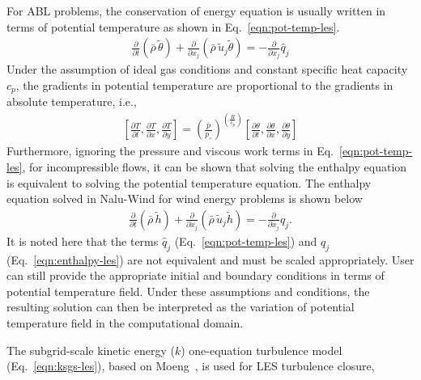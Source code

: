 For ABL problems, the conservation of energy equation is usually written in
terms of potential temperature as shown in Eq.~\ref{eqn:pot-temp-les}.
\begin{align}
  \frac{\partial}{\partial t} \left(\bar{\rho}\, \widetilde{\theta}\right) +
  \frac{\partial}{\partial x_j} \left(\bar{\rho}\, \widetilde{u}_j \widetilde{\theta} \right) = - \frac{\partial}{\partial x_j} \hat{q}_j \label{eqn:pot-temp-les}
\end{align}
Under the assumption of ideal gas conditions and constant specific heat capacity
$c_p$, the gradients in potential temperature are proportional to the gradients
in absolute temperature, i.e.,
\begin{align}
   \left[ \frac{\partial T}{\partial t}, \frac{\partial T}{\partial x}, \frac{\partial T}{\partial y} \right] =
   \left( \frac{\bar{p}}{p_\circ} \right)^{\left(\frac{R}{c_p}\right)} \left[ \frac{\partial \theta}{\partial t}, \frac{\partial \theta}{\partial x}, \frac{\partial \theta}{\partial y} \right]
\end{align}
Furthermore, ignoring the pressure and viscous work terms in
Eq.~\ref{eqn:pot-temp-les}, for incompressible flows, it can be shown that
solving the enthalpy equation is equivalent to solving the potential temperature
equation. The enthalpy equation solved in Nalu-Wind for wind energy problems is
shown below
\begin{align}
  \frac{\partial}{\partial t} \left(\bar{\rho}\, \widetilde{h}\right) +
  \frac{\partial}{\partial x_j} \left(\bar{\rho}\, \widetilde{u}_j \widetilde{h} \right) = - \frac{\partial}{\partial x_j} q_j . \label{eqn:enthalpy-les}
\end{align}
It is noted here that the terms $\hat{q}_j$ (Eq.~\ref{eqn:pot-temp-les}) and
$q_j$ (Eq.~\ref{eqn:enthalpy-les}) are not equivalent and must be scaled
appropriately. User can still provide the appropriate initial and boundary
conditions in terms of potential temperature field. Under these assumptions and
conditions, the resulting solution can then be interpreted as the variation of
potential temperature field in the computational domain.

The subgrid-scale kinetic energy ($k$) one-equation turbulence model
(Eq.~\ref{eqn:ksgs-les}), based on Moeng~\cite{Moeng1984}, is used for
LES turbulence closure,

